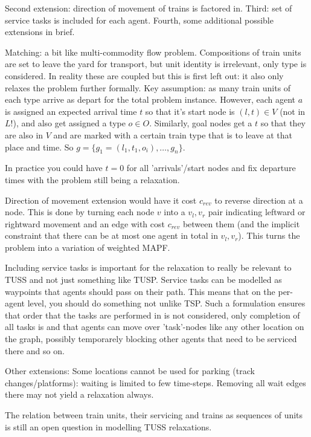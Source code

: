 \documentclass[a4paper,10pt,english]{article}
\begin{document}
	 Second extension: direction of movement of trains is factored in. Third: set of service tasks is included for each agent. Fourth, some additional possible extensions in brief.
	 
	 
	 Matching: a bit like multi-commodity flow problem. Compositions of train units are set to leave the yard for transport, but unit identity is irrelevant, only type is considered. In reality these are coupled but this is first left out: it also only relaxes the problem further formally. Key assumption: as many train units of each type arrive as depart for the total problem instance. However, each agent $a$ is assigned an expected arrival time $t$ so that it's start node is $(l,t)\in V$ (not in $L$!), and also get assigned a type $o\in O$. Similarly, goal nodes get a $t$ so that they are also in $V$ and are marked with a certain train type that is to leave at that place and time. So $g = \{g_1 = (l_1,t_1,o_i),\ldots, g_n\}$.
	 
	 In practice you could have $t=0$ for all 'arrivals'/start nodes and fix departure times with the problem still being a relaxation.
	 
	 Direction of movement extension would have it cost $c_{rev}$ to reverse direction at a node. This is done by turning each node $v$ into a $v_l,v_r$ pair indicating leftward or rightward movement and an edge with cost $c_{rev}$ between them (and the implicit constraint that there can be at most one agent in total in $v_l,v_r$). This turns the problem into a variation of weighted MAPF.
	 
	 Including service tasks is important for the relaxation to really be relevant to TUSS and not just something like TUSP. Service tasks can be modelled as waypoints that agents should pass on their path. This means that on the per-agent level, you should do something not unlike TSP. Such a formulation ensures that order that the tasks are performed in is not considered, only completion of all tasks is and that agents can move over 'task'-nodes like any other location on the graph, possibly temporarely blocking other agents that need to be serviced there and so on.
	 
	 Other extensions:
	 Some locations cannot be used for parking (track changes/platforms): waiting is limited to few time-steps. Removing all wait edges there may not yield a relaxation always.
	 
	 The relation between train units, their servicing and trains as sequences of units is still an open question in modelling TUSS relaxations.
	 
\end{document}
